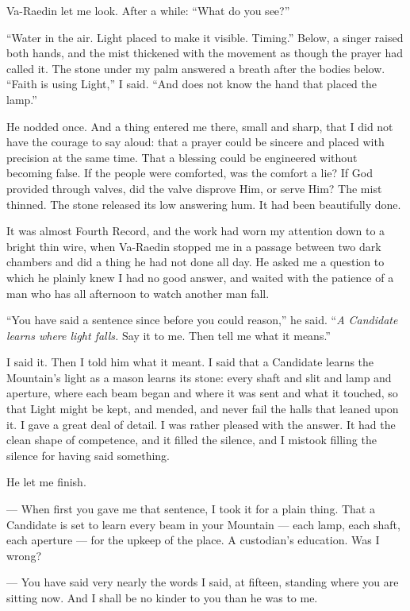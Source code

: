 Va-Raedin let me look. After a while: ``What do you see?''\par

``Water in the air. Light placed to make it visible. Timing.'' 
Below, a singer raised both hands, and the mist thickened with the movement as though the prayer had called it. 
The stone under my palm answered a breath after the bodies below. 
``Faith is using Light,'' I said. ``And does not know the hand that placed the lamp.''\par

He nodded once. 
And a thing entered me there, small and sharp, that I did not have the courage to say aloud: that a prayer could be sincere and placed with precision at the same time. 
That a blessing could be engineered without becoming false. 
If the people were comforted, was the comfort a lie? 
If God provided through valves, did the valve disprove Him, or serve Him? 
The mist thinned. 
The stone released its low answering hum. 
It had been beautifully done.\par

\ornament

It was almost Fourth Record, and the work had worn my attention down to a bright thin wire, when Va-Raedin stopped me in a passage between two dark chambers and 
did a thing he had not done all day. 
He asked me a question to which he plainly knew I had no good answer, and waited with the patience of a man who has all afternoon to watch another man fall.\par

``You have said a sentence since before you could reason,'' he said. 
``\textit{A Candidate learns where light falls.} Say it to me. Then tell me what it means.''\par

I said it. 
Then I told him what it meant. 
I said that a Candidate learns the Mountain's light as a mason learns its stone: every shaft and slit and lamp and aperture, 
where each beam began and where it was sent and what it touched, so that Light might be kept, and mended, and never fail the halls that leaned upon it. 
I gave a great deal of detail. 
I was rather pleased with the answer. 
It had the clean shape of competence, and it filled the silence, and I mistook filling the silence for having said something.\par

He let me finish.\par

\begin{room}

--- When first you gave me that sentence, I took it for a plain thing. That a Candidate is set to learn every beam in your Mountain --- each lamp, each shaft, each aperture --- for the upkeep of the place. A custodian's education. Was I wrong?

--- You have said very nearly the words I said, at fifteen, standing where you are sitting now. And I shall be no kinder to you than he was to me.

\end{room}

